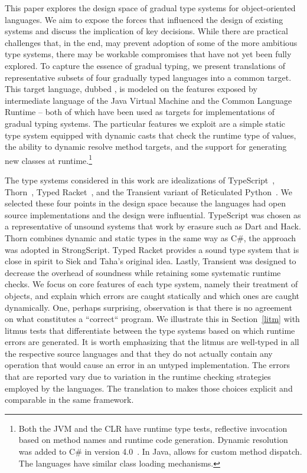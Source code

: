 \documentclass[acmlarge, anonymous, authordraft, review]{acmart} %
\begin{document}
This paper explores the design space of gradual type systems for
object-oriented languages. We aim to expose the forces that influenced the
design of existing systems and discuss the implication of key
decisions. While there are practical challenges that, in the end, may
prevent adoption of some of the more ambitious type systems, there may be
workable compromises that have not yet been fully explored.  To capture the
essence of gradual typing, we present translations of representative subsets
of four gradually typed languages into a common target. This target
language, dubbed \kafka, is modeled on the features exposed by intermediate
language of the Java Virtual Machine and the Common Language Runtime -- both
of which have been used as targets for implementations of gradual typing
systems.  The particular features we exploit are a simple static type system
equipped with dynamic casts that check the runtime type of values, the
ability to dynamic resolve method targets, and the support for generating
new classes at runtime.\footnote{Both the JVM and the CLR have runtime type
  tests, reflective invocation based on method names and runtime code
  generation. Dynamic resolution was added to C\# in version
  4.0~\cite{BAT14}. In Java,  allows for custom method
  dispatch. The languages have similar class loading mechanisms.}

The type systems considered in this work are idealizations of
TypeScript~\cite{BAT14}, Thorn~\cite{oopsla09}, Typed
Racket~\cite{tf-popl08}, and the Transient variant of Reticulated
Python~\cite{siek14}. We selected these four points in the design space
because the languages had open source implementations and the design were
influential.  TypeScript was chosen as a representative of unsound systems
that work by erasure such as Dart and Hack. Thorn combines dynamic and
static types in the same way as C\#, the approach was adopted in
StrongScript. Typed Racket provides a sound type system that is close in
spirit to Siek and Taha's original idea. Lastly, Transient was designed to
decrease the overhead of soundness while retaining some systematic runtime
checks.  We focus on core features of each type system, namely their
treatment of objects, and explain which errors are caught statically and
which ones are caught dynamically. One, perhaps surprising, observation is
that there is no agreement on what constitutes a ``correct`` program.  We
illustrate this in Section~\ref{litm} with litmus tests that differentiate
between the type systems based on which runtime errors are generated. It is
worth emphasizing that the litmus are well-typed in all the respective
source languages and that they do not actually contain any operation that
would cause an error in an untyped implementation. The errors that are
reported vary due to variation in the runtime checking strategies employed
by the languages.  The translation to \kafka makes those choices explicit
and comparable in the same framework.
\end{document}
